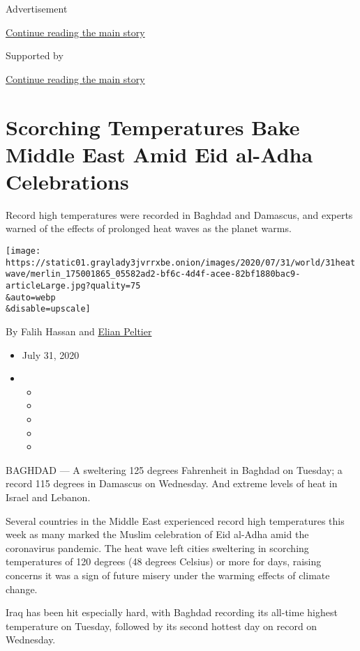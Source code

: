 Advertisement

\protect\hyperlink{after-top}{Continue reading the main story}

Supported by

\protect\hyperlink{after-sponsor}{Continue reading the main story}

\hypertarget{scorching-temperatures-bake-middle-east-amid-eid-al-adha-celebrations}{%
\section{Scorching Temperatures Bake Middle East Amid Eid al-Adha
Celebrations}\label{scorching-temperatures-bake-middle-east-amid-eid-al-adha-celebrations}}

Record high temperatures were recorded in Baghdad and Damascus, and
experts warned of the effects of prolonged heat waves as the planet
warms.

\texttt{[image: https://static01.graylady3jvrrxbe.onion/images/2020/07/31/world/31heatwave/merlin\_175001865\_05582ad2-bf6c-4d4f-acee-82bf1880bac9-articleLarge.jpg?quality=75\\\&auto=webp\\\&disable=upscale]}

By Falih Hassan and
\href{https://www.nytimes3xbfgragh.onion/by/elian-peltier}{Elian
Peltier}

\begin{itemize}
\item
  July 31, 2020
\item
  \begin{itemize}
  \item
  \item
  \item
  \item
  \item
  \end{itemize}
\end{itemize}

BAGHDAD --- A sweltering 125 degrees Fahrenheit in Baghdad on Tuesday; a
record 115 degrees in Damascus on Wednesday. And extreme levels of heat
in Israel and Lebanon.

Several countries in the Middle East experienced record high
temperatures this week as many marked the Muslim celebration of Eid
al-Adha amid the coronavirus pandemic. The heat wave left cities
sweltering in scorching temperatures of 120 degrees (48 degrees Celsius)
or more for days, raising concerns it was a sign of future misery under
the warming effects of climate change.

Iraq has been hit especially hard, with Baghdad recording its all-time
highest temperature on Tuesday, followed by its second hottest day on
record on Wednesday.

